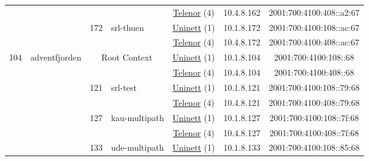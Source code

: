 \begin{small}
\begin{center}
\begin{longtable}{|c|c|c|c|c|c|c|c|}
  &  &  &  & \multicolumn{2}{|c|}{\tiny{\href{https://www.telenor.no}{Telenor} (4)}} & \tiny{10.4.8.162} & \tiny{2001:700:4100:408::a2:67} \\* \cline{3-3}\cline{4-4}\cline{5-5}\cline{6-6}\cline{7-7}\cline{8-8}
  &  & \multirow{2}{*}{\tiny{172}} & \multicolumn{1}{|l|}{\multirow{2}{*}{\tiny{srl-thuen}}} & \multicolumn{2}{|c|}{\tiny{\href{https://www.uninett.no}{Uninett} (1)}} & \tiny{10.1.8.172} & \tiny{2001:700:4100:108::ac:67} \\* \cline{5-5}\cline{6-6}\cline{7-7}\cline{8-8}
  &  &  &  & \multicolumn{2}{|c|}{\tiny{\href{https://www.telenor.no}{Telenor} (4)}} & \tiny{10.4.8.172} & \tiny{2001:700:4100:408::ac:67} \\ \hline
 \multirow{22}{*}{\tiny{104}} & \multicolumn{1}{|l|}{\multirow{22}{*}{\tiny{adventfjorden}}} & \multicolumn{2}{|c|}{\multirow{2}{*}{\tiny{Root Context}}} & \multicolumn{2}{|c|}{\tiny{\href{https://www.uninett.no}{Uninett} (1)}} & \tiny{10.1.8.104} & \tiny{2001:700:4100:108::68} \\* \cline{5-5}\cline{6-6}\cline{7-7}\cline{8-8}
  &  & \multicolumn{2}{|c|}{} & \multicolumn{2}{|c|}{\tiny{\href{https://www.telenor.no}{Telenor} (4)}} & \tiny{10.4.8.104} & \tiny{2001:700:4100:408::68} \\* \cline{3-3}\cline{4-4}\cline{5-5}\cline{6-6}\cline{7-7}\cline{8-8}
  &  & \multirow{2}{*}{\tiny{121}} & \multicolumn{1}{|l|}{\multirow{2}{*}{\tiny{srl-test}}} & \multicolumn{2}{|c|}{\tiny{\href{https://www.uninett.no}{Uninett} (1)}} & \tiny{10.1.8.121} & \tiny{2001:700:4100:108::79:68} \\* \cline{5-5}\cline{6-6}\cline{7-7}\cline{8-8}
  &  &  &  & \multicolumn{2}{|c|}{\tiny{\href{https://www.telenor.no}{Telenor} (4)}} & \tiny{10.4.8.121} & \tiny{2001:700:4100:408::79:68} \\* \cline{3-3}\cline{4-4}\cline{5-5}\cline{6-6}\cline{7-7}\cline{8-8}
  &  & \multirow{2}{*}{\tiny{127}} & \multicolumn{1}{|l|}{\multirow{2}{*}{\tiny{kau-multipath}}} & \multicolumn{2}{|c|}{\tiny{\href{https://www.uninett.no}{Uninett} (1)}} & \tiny{10.1.8.127} & \tiny{2001:700:4100:108::7f:68} \\* \cline{5-5}\cline{6-6}\cline{7-7}\cline{8-8}
  &  &  &  & \multicolumn{2}{|c|}{\tiny{\href{https://www.telenor.no}{Telenor} (4)}} & \tiny{10.4.8.127} & \tiny{2001:700:4100:408::7f:68} \\* \cline{3-3}\cline{4-4}\cline{5-5}\cline{6-6}\cline{7-7}\cline{8-8}
  &  & \multirow{2}{*}{\tiny{133}} & \multicolumn{1}{|l|}{\multirow{2}{*}{\tiny{ude-multipath}}} & \multicolumn{2}{|c|}{\tiny{\href{https://www.uninett.no}{Uninett} (1)}} & \tiny{10.1.8.133} & \tiny{2001:700:4100:108::85:68} \\* \cline{5-5}\cline{6-6}\cline{7-7}\cline{8-8}

\end{longtable}
\end{center}
\end{small}
